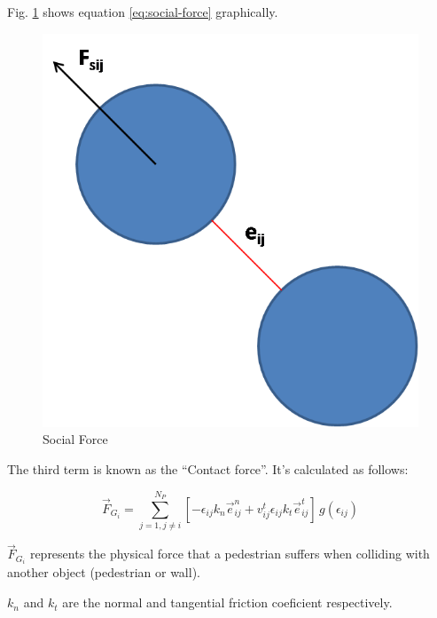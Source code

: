 \documentclass[english]{article}
\begin{document}
    
    Fig. \ref{fig:Social-Force} shows equation \ref{eq:social-force} graphically.
    
    \begin{figure}[h]
        \begin{centering}
        \includegraphics[scale=0.4]{pics/sfm/sf} \par
        \end{centering}
        \caption{Social Force\label{fig:Social-Force}}
    \end{figure}

    The third term is known as the ``Contact force''. It's calculated
    as follows:

    \begin{equation}
        \vec{F}_{G_{i}} = \sum_{j=1,j\ne i}^{N_{P}} [-\epsilon_{ij}k_{n}\vec{e}_{ij}^{n} + v_{ij}^{t} \epsilon_{ij} k_{t} \vec{e}_{ij}^{t}] \, g(\epsilon_{ij})
        \label{eq:granular-force}
    \end{equation}

    $\vec{F}_{G_{i}}$ represents the physical force that a pedestrian
    suffers when colliding with another object (pedestrian or wall).

    $k_{n}$ and $k_{t}$ are the normal and tangential friction coeficient
    respectively.
\end{document}
